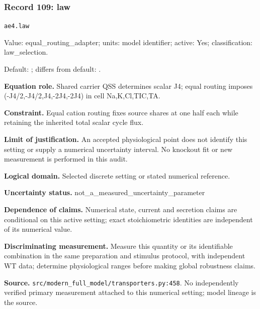 \subsubsection*{Record 109: law}
{\small \nolinkurl{ae4.law}\par

Value: equal\_routing\_adapter; units: model identifier; active: Yes; classification: law\_selection.\par

Default: ; differs from default: .\par

\textbf{Equation role.} Shared carrier QSS determines scalar J4; equal routing imposes (-J4/2,-J4/2,J4,-2J4,-2J4) in cell Na,K,Cl,TIC,TA.\par

\textbf{Constraint.} Equal cation routing fixes source shares at one half each while retaining the inherited total scalar cycle flux.\par

\textbf{Limit of justification.} An accepted physiological point does not identify this setting or supply a numerical uncertainty interval. No knockout fit or new measurement is performed in this audit.\par

\textbf{Logical domain.} Selected discrete setting or stated numerical reference.\par

\textbf{Uncertainty status.} not\_a\_measured\_uncertainty\_parameter\par

\textbf{Dependence of claims.} Numerical state, current and secretion claims are conditional on this active setting; exact stoichiometric identities are independent of its numerical value.\par

\textbf{Discriminating measurement.} Measure this quantity or its identifiable combination in the same preparation and stimulus protocol, with independent WT data; determine physiological ranges before making global robustness claims.\par

\textbf{Source.} \nolinkurl{src/modern_full_model/transporters.py:458}. No independently verified primary measurement attached to this numerical setting; model lineage is the source.\par}

